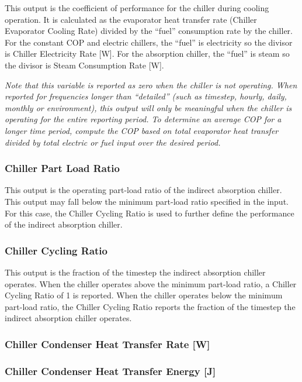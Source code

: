 This output is the coefficient of performance for the chiller during cooling operation. It is calculated as the evaporator heat transfer rate (Chiller Evaporator Cooling Rate) divided by the ``fuel'' consumption rate by the chiller. For the constant COP and electric chillers, the ``fuel'' is electricity so the divisor is Chiller Electricity Rate {[}W{]}. For the absorption chiller, the ``fuel'' is steam so the divisor is Steam Consumption Rate {[}W{]}.

\emph{Note that this variable is reported as zero when the chiller is not operating. When reported for frequencies longer than ``detailed'' (such as timestep, hourly, daily, monthly or environment), this output will only be meaningful when the chiller is operating for the entire reporting period. To determine an average COP for a longer time period, compute the COP based on total evaporator heat transfer divided by total electric or fuel input over the desired period.}

\subsubsection{Chiller Part Load Ratio}\label{chiller-part-load-ratio}

This output is the operating part-load ratio of the indirect absorption chiller. This output may fall below the minimum part-load ratio specified in the input. For this case, the Chiller Cycling Ratio is used to further define the performance of the indirect absorption chiller.

\subsubsection{Chiller Cycling Ratio}\label{chiller-cycling-ratio}

This output is the fraction of the timestep the indirect absorption chiller operates. When the chiller operates above the minimum part-load ratio, a Chiller Cycling Ratio of 1 is reported. When the chiller operates below the minimum part-load ratio, the Chiller Cycling Ratio reports the fraction of the timestep the indirect absorption chiller operates.

\subsubsection{Chiller Condenser Heat Transfer Rate {[}W{]}}\label{chiller-condenser-heat-transfer-rate-w}

\subsubsection{Chiller Condenser Heat Transfer Energy {[}J{]}}\label{chiller-condenser-heat-transfer-energy-j}

